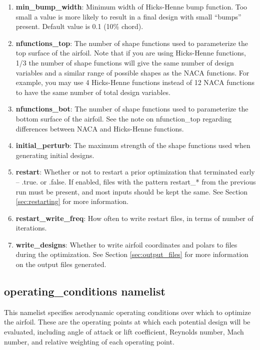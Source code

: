 \documentclass[11pt]{article}
\begin{document}
\begin{enumerate}
{variable width and location on the airfoil surface.  Each Hicks-Henne shape function,
therefore, has a strength and also a width and location, whereas each NACA function only
has a strength.}
\item{\textbf{min\_bump\_width}: Minimum width of Hicks-Henne bump function.  Too small a
value is more likely to result in a final design with small ``bumps'' present.  Default
value is 0.1 (10\% chord).}
\item{\textbf{nfunctions\_top}: The number of shape functions used to parameterize the top
surface of the airfoil.  Note that if you are using Hicks-Henne functions, 1/3 the
number of shape functions will give the same number of design variables and a similar range of
possible shapes as the NACA functions.  For example, you may use 4 Hicks-Henne functions
instead of 12 NACA functions to have the same number of total design variables.}
\item{\textbf{nfunctions\_bot}: The number of shape functions used to parameterize the
bottom surface of the airfoil.  See the note on nfunction\_top regarding differences
between NACA and Hicks-Henne functions.}
\item{\textbf{initial\_perturb}: The maximum strength of the shape functions used when
generating initial designs.}
\item{\textbf{restart}: Whether or not to restart a prior optimization that terminated
early -- .true. or .false.  If enabled, files with the pattern restart\_* from the 
previous run must be present, and most inputs should be kept the same. See Section 
\ref{sec:restarting} for more information.}
\item{\textbf{restart\_write\_freq}: How often to write restart files, in terms of number
of iterations.}
\item{\textbf{write\_designs}: Whether to write airfoil coordinates and polars to files
during the optimization.  See Section \ref{sec:output_files} for more information on the
output files generated.}
\end{enumerate}

\subsection{operating\_conditions namelist}

This namelist specifies aerodynamic operating conditions over which to optimize the
airfoil.  These are the operating points at which each potential design will be evaluated,
including angle of attack or lift coefficient, Reynolds number, Mach number, and
relative weighting of each operating point.
\end{document}
